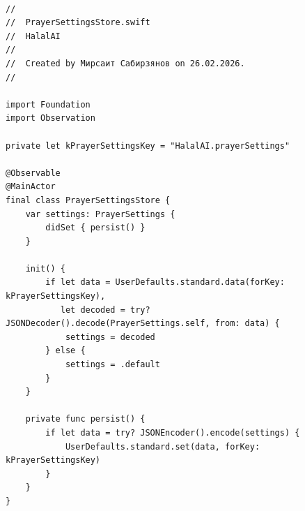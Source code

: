 \begin{lstlisting}[basicstyle=\tiny\ttfamily,breaklines=true]

//
//  PrayerSettingsStore.swift
//  HalalAI
//
//  Created by Мирсаит Сабирзянов on 26.02.2026.
//

import Foundation
import Observation

private let kPrayerSettingsKey = "HalalAI.prayerSettings"

@Observable
@MainActor
final class PrayerSettingsStore {
    var settings: PrayerSettings {
        didSet { persist() }
    }

    init() {
        if let data = UserDefaults.standard.data(forKey: kPrayerSettingsKey),
           let decoded = try? JSONDecoder().decode(PrayerSettings.self, from: data) {
            settings = decoded
        } else {
            settings = .default
        }
    }

    private func persist() {
        if let data = try? JSONEncoder().encode(settings) {
            UserDefaults.standard.set(data, forKey: kPrayerSettingsKey)
        }
    }
}
\end{lstlisting}

